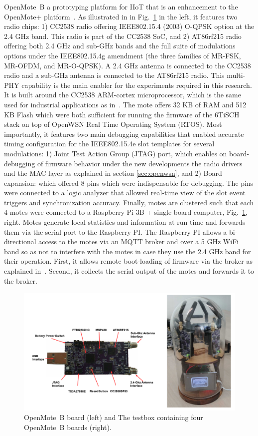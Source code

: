 \documentclass[journal,article,submit,moreauthors,pdftex]{Definitions/mdpi}
\begin{document}
OpenMote~B a prototyping platform for IIoT that is an enhancement to the OpenMote+ platform~\cite{tusetopenmote}. 
As illustrated in in Fig.~\ref{fig:mote_ot} in the left,  it features two radio chips: 
	1) CC2538 radio offering IEEE802.15.4 (2003) O-QPSK option at the 2.4 GHz band. This radio is part of the CC2538 SoC, and 
    2) AT86rf215 radio offering both 2.4 GHz and sub-GHz bands and the full suite of modulations options under the IEEE802.15.4g amendment (the three families of MR-FSK, MR-OFDM, and MR-O-QPSK). 
A 2.4 GHz antenna is connected to the CC2538 radio and a sub-GHz antenna is connected to the AT86rf215 radio.
This multi-PHY capability is the main enabler for the experiments required in this research. 
It is built around the CC2538 ARM-cortex microprocessor, which is the same used for industrial applications as in~\cite{civerchia17industrial}.
The mote offers 32 KB of RAM and 512 KB Flash which were both sufficient for running the firmware of the 6TiSCH stack on top of OpenWSN Real Time Operating System (RTOS). 
Most importantly, it features two main debugging capabilities that enabled accurate timing configuration for the IEEE802.15.4e slot templates for several modulations:
1) Joint Test Action Group (JTAG) port, which enables on board-debugging of firmware behavior under the new developments the radio drivers and the MAC layer as explained in section \ref{sec:openwsn}, and 
2) Board expansion: which offered 8 pins which were indispensable for debugging. The pins were connected to a logic analyzer that allowed real-time view of the slot event triggers and synchronization accuracy.
Finally, motes are clustered such that each 4 motes were connected to a Raspberry Pi 3B + single-board computer, Fig.~\ref{fig:mote_ot}, right.
Motes generate local statistics and information at run-time and forwards them via the serial port to the Raspberry PI. 
The Raspberry PI allows a bi-directional access to the motes via an MQTT broker and over a 5 GHz WiFi band so as not to interfere with the motes in case they use the 2.4 GHz band for their operation.
First, it allows remote boot-loading of firmware via the broker as explained in~\cite{munoz19opentestbed}.
Second, it collects the serial output of the motes and forwards it to the  broker. 

\begin{figure}
	\centering
	\includegraphics[width=0.90\columnwidth]{mote_ot}
	\caption{OpenMote~B board (left) and The testbox containing four OpenMote~B boards (right).}
    \label{fig:mote_ot}
\end{figure}
\end{document}
